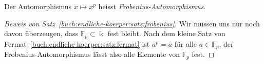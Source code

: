 \begin{definition}
Der Automorphismus $x\mapsto x^p$ heisst {\em Frobenius-Automorphismus}.
\end{definition}

\begin{proof}[Beweis von Satz~\ref{buch:endliche-koerper:satz:frobenius}]
Wir müssen uns nur noch davon überzeugen, dass $\mathbb{F}_p\subset\Bbbk$
fest bleibt.
Nach dem kleine Satz von Fermat~\ref{buch:endliche-koerper:satz:fermat}
ist $a^p=a$ für alle $a\in\mathbb{F}_p$, der Frobenius-Automorphismus
lässt also alle Elemente von $\mathbb{F}_p$ fest.
\end{proof}

